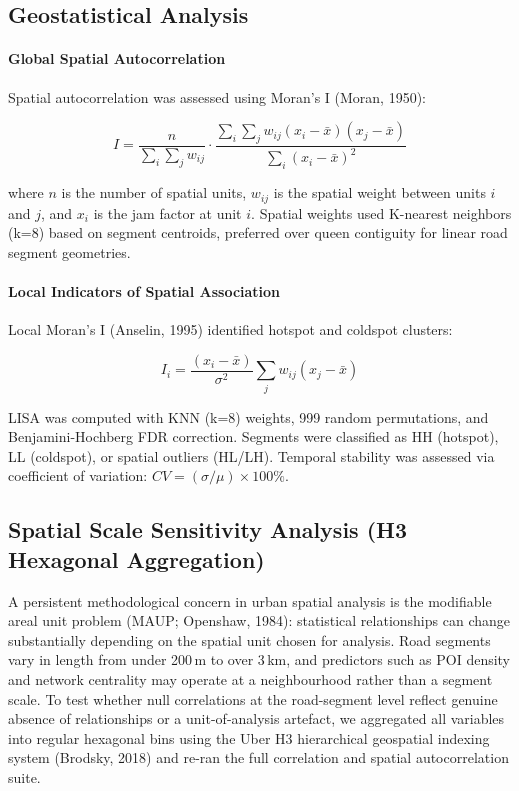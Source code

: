 \documentclass[12pt,a4paper]{article}
\begin{document}
\subsection{Geostatistical Analysis}

\paragraph{Global Spatial Autocorrelation}

Spatial autocorrelation was assessed using Moran's I (Moran, 1950):

\[I = \frac{n}{\sum_i \sum_j w_{ij}} \cdot \frac{\sum_i \sum_j w_{ij}(x_i - \bar{x})(x_j - \bar{x})}{\sum_i (x_i - \bar{x})^2}\]

where $n$ is the number of spatial units, $w_{ij}$ is the spatial weight between units $i$ and $j$, and $x_i$ is the jam factor at unit $i$. Spatial weights used K-nearest neighbors (k=8) based on segment centroids, preferred over queen contiguity for linear road segment geometries.

\paragraph{Local Indicators of Spatial Association}

Local Moran's I (Anselin, 1995) identified hotspot and coldspot clusters:

\[I_i = \frac{(x_i - \bar{x})}{\sigma^2} \sum_j w_{ij}(x_j - \bar{x})\]

LISA was computed with KNN (k=8) weights, 999 random permutations, and Benjamini-Hochberg FDR correction. Segments were classified as HH (hotspot), LL (coldspot), or spatial outliers (HL/LH). Temporal stability was assessed via coefficient of variation: $CV = (\sigma/\mu) \times 100\%$.

\subsection{Spatial Scale Sensitivity Analysis (H3 Hexagonal Aggregation)}
\label{sec:method_h3}

A persistent methodological concern in urban spatial analysis is the modifiable areal unit problem (MAUP; Openshaw, 1984): statistical relationships can change substantially depending on the spatial unit chosen for analysis. Road segments vary in length from under 200\,m to over 3\,km, and predictors such as POI density and network centrality may operate at a neighbourhood rather than a segment scale. To test whether null correlations at the road-segment level reflect genuine absence of relationships or a unit-of-analysis artefact, we aggregated all variables into regular hexagonal bins using the Uber H3 hierarchical geospatial indexing system (Brodsky, 2018) and re-ran the full correlation and spatial autocorrelation suite.
\end{document}
